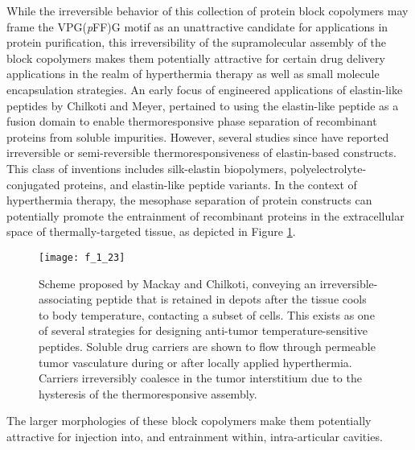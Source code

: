\begin{refsection}
While the irreversible behavior of this collection of protein block copolymers
may frame the VPG(\emph{p}FF)G motif as an unattractive candidate for
applications in protein purification, this irreversibility of the supramolecular
assembly of the block copolymers makes them potentially attractive for certain drug delivery
applications in the realm of hyperthermia therapy as well as small molecule
encapsulation strategies. An early focus of engineered applications of 
elastin-like peptides by Chilkoti and Meyer, pertained to 
using the elastin-like peptide as a fusion domain to enable thermoresponsive
phase separation of recombinant proteins from soluble
impurities.\cite{Meyer1999,Meyer2001} However, several studies since have reported
irreversible or semi-reversible thermoresponsiveness of elastin-based
constructs. This class of inventions includes silk-elastin biopolymers,
polyelectrolyte-conjugated proteins, and elastin-like peptide
variants.\cite{Herrero-Vanrell2005,Megeed2002,Kayitmazer2007} In the context of
hyperthermia therapy, the mesophase separation of protein constructs can
potentially promote the entrainment of recombinant proteins in the extracellular
space of thermally-targeted tissue, as depicted in Figure
\ref{fig:irreversible_delivery}.
\begin{figure}[h!] \centering \texttt{[image: f\_1\_23]}
    \caption[Scheme proposed by Mackay and Chilkoti, conveying an
        irreversible-associating peptide that is retained in depots after the
        tissue cools to body temperature, contacting a subset of cells. This
        exists as one of several strategies for designing anti-tumor
        temperature-sensitive peptides. Soluble drug carriers are shown to flow
        through permeable tumor vasculature during or after locally applied
        hyperthermia. Carriers irreversibly coalesce in the tumor interstitium
        due to the hysteresis of the thermoresponsive assembly.]
{Scheme proposed by Mackay and Chilkoti,\cite{Mackay2008} conveying an
irreversible-associating peptide that is retained in depots after the tissue
cools to body temperature, contacting a subset of cells. This exists as one of
several strategies for designing anti-tumor temperature-sensitive peptides.
Soluble drug carriers are shown to flow through permeable tumor vasculature
during or after locally applied hyperthermia. Carriers irreversibly coalesce in
the tumor interstitium due to the hysteresis of the thermoresponsive assembly.}

\label{fig:irreversible_delivery} \end{figure}
The larger morphologies of these block copolymers make them potentially attractive
for injection into, and entrainment within, intra-articular
cavities.\cite{Nettles2008,Betre2006a}


\end{refsection}
